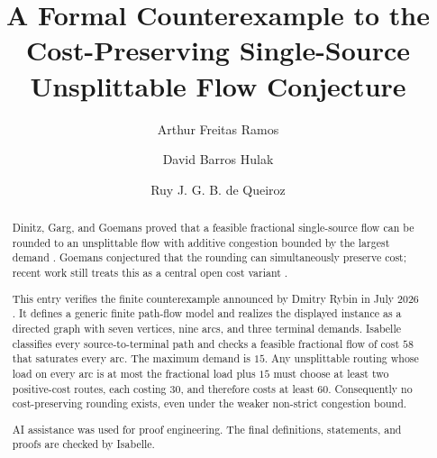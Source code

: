 \documentclass[11pt,a4paper]{article}
\begin{document}
\title{A Formal Counterexample to the Cost-Preserving
  Single-Source Unsplittable Flow Conjecture}
\author{Arthur Freitas Ramos \and David Barros Hulak \and
  Ruy J. G. B. de Queiroz}
\maketitle

\begin{abstract}
Dinitz, Garg, and Goemans proved that a feasible fractional single-source flow
can be rounded to an unsplittable flow with additive congestion bounded by the
largest demand \cite{DinitzGargGoemans1999}.  Goemans conjectured that the
rounding can simultaneously preserve cost; recent work still treats this as a
central open cost variant \cite{TraubVargasKochZenklusen2026}.

This entry verifies the finite counterexample announced by Dmitry Rybin in July
2026 \cite{Rybin2026}.  It defines a generic finite path-flow model and realizes
the displayed instance as a directed graph with seven vertices, nine arcs, and
three terminal demands.  Isabelle classifies every source-to-terminal path and
checks a feasible fractional flow of cost $58$ that saturates every arc.  The
maximum demand is $15$.  Any unsplittable routing whose load on every arc is at
most the fractional load plus $15$ must choose at least two positive-cost
routes, each costing $30$, and therefore costs at least $60$.  Consequently no
cost-preserving rounding exists, even under the weaker non-strict congestion
bound.

AI assistance was used for proof engineering. The final definitions,
statements, and proofs are checked by Isabelle.
\end{abstract}

\tableofcontents





\end{document}

